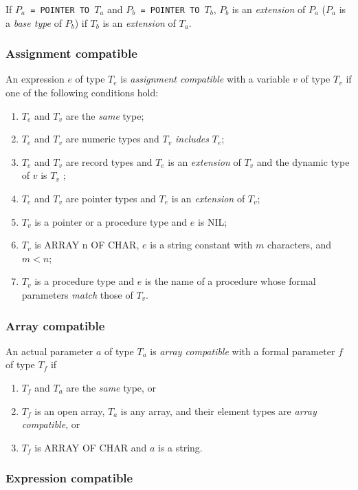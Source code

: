 If {\tt $P_a$ = POINTER TO $T_a$}
and {\tt $P_b$ = POINTER TO $T_b$}, $P_b$ is an {\em extension} of
$P_a$ ($P_a$ is a {\em base type} of $P_b$)
if $T_b$ is an {\em extension} of $T_a$.

\subsubsection{Assignment compatible}

An expression $e$ of type $T_e$ is {\em assignment compatible} with a variable
$v$ of type $T_v$ if one of the following conditions hold:
\begin{enumerate}
\item
$T_e$ and $T_v$ are the {\em same} type;
\item
$T_e$ and $T_v$ are numeric types and $T_v$ {\em includes} $T_e$;
\item
$T_e$ and $T_v$ are record types and $T_e$ is an {\em extension}
of $T_v$ and the dynamic type of $v$ is $T_v$ ;
\item
$T_e$ and $T_v$ are pointer types and $T_e$ is an {\em extension}
of $T_v$;
\item
$T_v$ is a pointer or a procedure type and $e$ is NIL;
\item
$T_v$ is ARRAY n OF CHAR, $e$ is a string constant with
$m$ characters, and $m < n$;
\item
$T_v$ is a procedure type and $e$ is the name of a procedure
whose formal parameters {\em match} those of $T_v$.
\end{enumerate}

\subsubsection{Array compatible}

An actual parameter $a$ of type $T_a$ is {\em array compatible} with a formal
parameter $f$ of type $T_f$ if
\begin{enumerate}
\item
$T_f$ and $T_a$ are the {\em same} type, or
\item
$T_f$ is an open array, $T_a$ is any array, and their
element types are {\em array compatible}, or
\item
$T_f$ is ARRAY OF CHAR and $a$ is a string.
\end{enumerate}

\subsubsection{Expression compatible}

